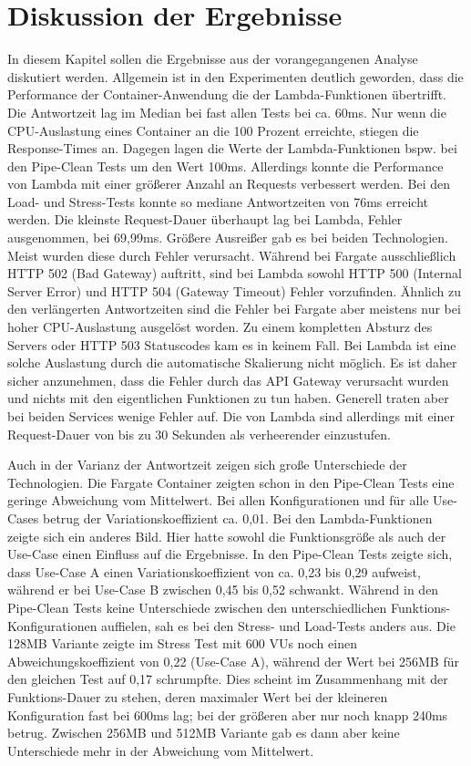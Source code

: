 \chapter{Diskussion der Ergebnisse}
In diesem Kapitel sollen die Ergebnisse aus der vorangegangenen Analyse diskutiert werden.
Allgemein ist in den Experimenten deutlich geworden, dass die Performance der Container-Anwendung die der Lambda-Funktionen übertrifft. Die Antwortzeit lag im Median bei fast allen Tests bei ca. 60ms. Nur wenn die CPU-Auslastung eines Container an die 100 Prozent erreichte, stiegen die Response-Times an. Dagegen lagen die Werte der Lambda-Funktionen bspw. bei den Pipe-Clean Tests um den Wert 100ms. Allerdings konnte die Performance von Lambda mit einer größerer Anzahl an Requests verbessert werden. Bei den Load- und Stress-Tests konnte so mediane Antwortzeiten von 76ms erreicht werden. Die kleinste Request-Dauer überhaupt lag bei Lambda, Fehler ausgenommen, bei 69,99ms. Größere Ausreißer gab es bei beiden Technologien. Meist wurden diese durch Fehler verursacht. Während bei Fargate ausschließlich HTTP 502 (Bad Gateway) auftritt, sind bei Lambda sowohl HTTP 500 (Internal Server Error) und HTTP 504 (Gateway Timeout) Fehler vorzufinden. Ähnlich zu den verlängerten Antwortzeiten sind die Fehler bei Fargate aber meistens nur bei hoher CPU-Auslastung ausgelöst worden. Zu einem kompletten Absturz des Servers oder HTTP 503 Statuscodes kam es in keinem Fall. 
Bei Lambda ist eine solche Auslastung durch die automatische Skalierung nicht möglich. Es ist daher sicher anzunehmen, dass die Fehler durch das API Gateway verursacht wurden und nichts mit den eigentlichen Funktionen zu tun haben. Generell traten aber bei beiden Services wenige Fehler auf. Die von Lambda sind allerdings mit einer Request-Dauer von bis zu 30 Sekunden als verheerender einzustufen.

Auch in der Varianz der Antwortzeit zeigen sich große Unterschiede der Technologien. Die Fargate Container zeigten schon in den Pipe-Clean Tests eine geringe Abweichung vom Mittelwert. Bei allen Konfigurationen und für alle Use-Cases betrug der Variationskoeffizient ca. 0,01. Bei den Lambda-Funktionen zeigte sich ein anderes Bild. Hier hatte sowohl die Funktionsgröße als auch der Use-Case einen Einfluss auf die Ergebnisse. In den Pipe-Clean Tests zeigte sich, dass Use-Case A einen Variationskoeffizient von ca. 0,23 bis 0,29 aufweist, während er bei Use-Case B zwischen 0,45 bis 0,52 schwankt. Während in den Pipe-Clean Tests keine Unterschiede zwischen den unterschiedlichen Funktions-Konfigurationen auffielen, sah es bei den Stress- und Load-Tests anders aus. Die 128MB Variante zeigte im Stress Test mit 600 VUs noch einen Abweichungskoeffizient von 0,22 (Use-Case A), während der Wert bei 256MB für den gleichen Test auf 0,17 schrumpfte. Dies scheint im Zusammenhang mit der Funktions-Dauer zu stehen, deren maximaler Wert bei der kleineren Konfiguration fast bei 600ms lag; bei der größeren aber nur noch knapp 240ms betrug. Zwischen 256MB und 512MB Variante gab es dann aber keine Unterschiede mehr in der Abweichung vom Mittelwert.


